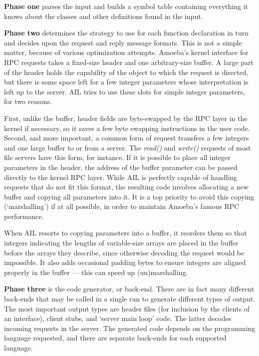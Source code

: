 {\bf Phase one} parses the input and builds a symbol table containing
everything it knows about the classes and other definitions found in
the input.

{\bf Phase two} determines the strategy to use for each function
declaration in turn and decides upon the request and reply message
formats.  This is not a simple matter, because of various optimization
attempts.  Amoeba's kernel interface for RPC requests takes a
fixed-size header and one arbitrary-size buffer.  A large part of the
header holds the capability of the object to which the request is
directed, but there is some space left for a few integer parameters
whose interpretation is left up to the server.  AIL tries to use these
slots for simple integer parameters, for two reasons.

First, unlike the buffer, header fields are byte-swapped by the RPC
layer in the kernel if necessary, so it saves a few byte swapping
instructions in the user code.  Second, and more important, a common
form of request transfers a few integers and one large buffer to or
from a server.  The {\em read()} and {\em write()} requests of most
file servers have this form, for instance.  If it is possible to place
all integer parameters in the header, the address of the buffer
parameter can be passed directly to the kernel RPC layer.  While AIL
is perfectly capable of handling requests that do not fit this format,
the resulting code involves allocating a new buffer and copying all
parameters into it.  It is a top priority to avoid this copying
(`marshalling') if at all possible, in order to maintain Amoeba's
famous RPC performance.

When AIL resorts to copying parameters into a buffer, it reorders them
so that integers indicating the lengths of variable-size arrays are
placed in the buffer before the arrays they describe, since otherwise
decoding the request would be impossible.  It also adds occasional
padding bytes to ensure integers are aligned properly in the buffer ---
this can speed up (un)marshalling.

{\bf Phase three} is the code generator, or back-end.  There are in
fact many different back-ends that may be called in a single run to
generate different types of output.  The most important output types
are header files (for inclusion by the clients of an interface),
client stubs, and `server main loop' code.  The latter decodes
incoming requests in the server.  The generated code depends on the
programming language requested, and there are separate back-ends for
each supported language.


